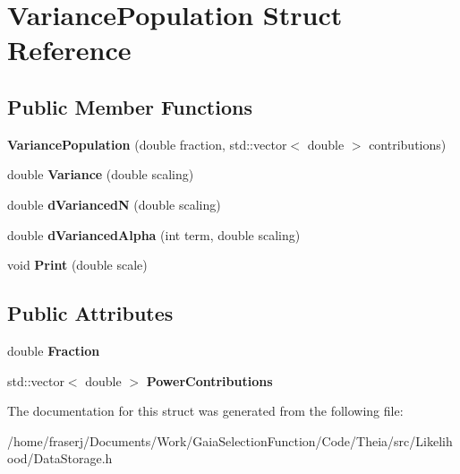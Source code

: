 \hypertarget{structVariancePopulation}{}\section{Variance\+Population Struct Reference}
\label{structVariancePopulation}
\subsection*{Public Member Functions}
\begin{DoxyCompactItemize}
\item 
\mbox{\label{structVariancePopulation_a0a0e089d1cc596857052c0043547adb1}} 
{\bfseries Variance\+Population} (double fraction, std\+::vector$<$ double $>$ contributions)
\item 
\mbox{\label{structVariancePopulation_a7328d57433a870f569cf6e2bcb12e2f3}} 
double {\bfseries Variance} (double scaling)
\item 
\mbox{\label{structVariancePopulation_a5a54f3140bc15898d3bf57340e19b90f}} 
double {\bfseries d\+VariancedN} (double scaling)
\item 
\mbox{\label{structVariancePopulation_ad2a89f4584be76a4822005764f2f6e6c}} 
double {\bfseries d\+Varianced\+Alpha} (int term, double scaling)
\item 
\mbox{\label{structVariancePopulation_ac601ad05d66b5691ed0a4b117b60c8d7}} 
void {\bfseries Print} (double scale)
\end{DoxyCompactItemize}
\subsection*{Public Attributes}
\begin{DoxyCompactItemize}
\item 
\mbox{\label{structVariancePopulation_aaaa1da9b4ed3f0d460a49cd0078330eb}} 
double {\bfseries Fraction}
\item 
\mbox{\label{structVariancePopulation_af81f6fdf859a22cc06de6f5bfb0ed0d0}} 
std\+::vector$<$ double $>$ {\bfseries Power\+Contributions}
\end{DoxyCompactItemize}


The documentation for this struct was generated from the following file\+:\begin{DoxyCompactItemize}
\item 
/home/fraserj/\+Documents/\+Work/\+Gaia\+Selection\+Function/\+Code/\+Theia/src/\+Likelihood/Data\+Storage.\+h\end{DoxyCompactItemize}

